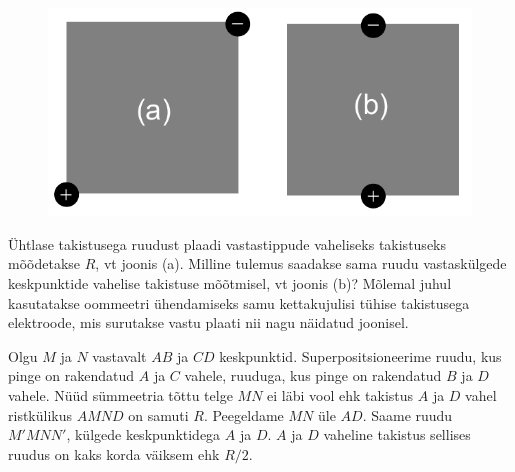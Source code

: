 \setAuthor{}

\begin{figure}
  \vspace{-25pt}
  \begin{center}
  \includegraphics[scale=0.44]{2020-v3g-10-yl.pdf}
  \end{center}
  \vspace{-25pt}
\end{figure}
Ühtlase takistusega ruudust plaadi vastastippude vaheliseks takistuseks mõõdetakse
$R$, vt joonis (a). Milline tulemus saadakse sama ruudu vastaskülgede keskpunktide
vahelise takistuse mõõtmisel, vt joonis (b)? Mõlemal juhul kasutatakse oommeetri
ühendamiseks samu kettakujulisi tühise takistusega elektroode, mis surutakse vastu
plaati nii nagu näidatud joonisel.


\hint

\solu
Olgu $M$ ja $N$ vastavalt $AB$ ja $CD$ keskpunktid. Superpositsioneerime
ruudu, kus pinge on rakendatud $A$ ja $C$ vahele, ruuduga, kus pinge on
rakendatud $B$ ja $D$ vahele. Nüüd sümmeetria tõttu telge $MN$ ei läbi vool
ehk takistus $A$ ja $D$ vahel ristkülikus $AMND$ on samuti $R$. Peegeldame
$MN$ üle $AD$. Saame ruudu $M'MNN'$, külgede keskpunktidega $A$ ja $D$. $A$ ja
$D$ vaheline takistus sellises ruudus on kaks korda väiksem ehk $R/2$.
\probend